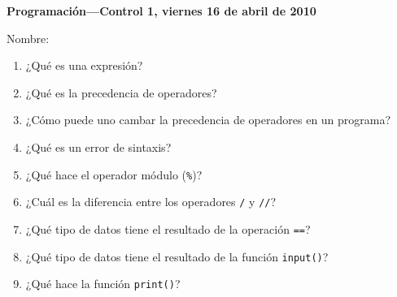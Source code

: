 \documentclass[12pt,spanish]{article}
\newcommand{\respuesta}{%
  \framebox[0.9\textwidth]{\rule[6.2ex]{0pt}{0pt}}%
}
\newcommand{\nombre}{%
  \framebox[0.8\textwidth]{\rule[2.3ex]{0pt}{0pt}}%
}
\begin{document}
  \thispagestyle{empty}
  {\Large\bfseries Programación---Control 1, viernes 16 de abril de 2010}

  Nombre: \nombre

  \begin{enumerate}
    \item ¿Qué es una expresión? \\
      \respuesta
    \item ¿Qué es la precedencia de operadores? \\
      \respuesta
    \item ¿Cómo puede uno cambar la precedencia de operadores en un programa? \\
      \respuesta
    \item ¿Qué es un error de sintaxis? \\
      \respuesta
    \item ¿Qué hace el operador módulo (\verb+%+)? \\
      \respuesta
    \item ¿Cuál es la diferencia entre los operadores \verb+/+ y \verb+//+? \\
      \respuesta
    \item ¿Qué tipo de datos tiene el resultado de la operación \verb+==+? \\
      \respuesta
    \item ¿Qué tipo de datos tiene el resultado de la función \verb+input()+? \\
      \respuesta
    \item ¿Qué hace la función \verb+print()+? \\
      \respuesta
  \end{enumerate}
\end{document}
